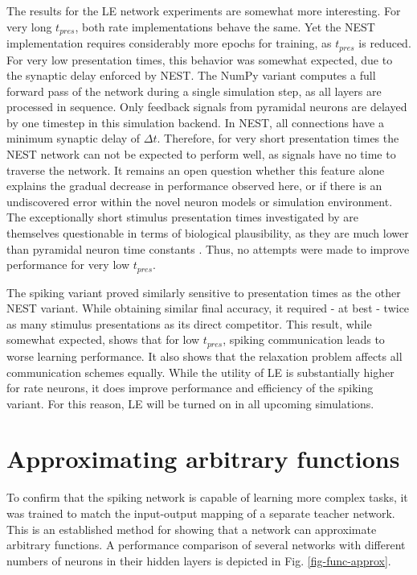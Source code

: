 The results for the LE network experiments are somewhat more interesting. For very long $t_{pres}$, both rate
implementations behave the same. Yet the NEST implementation requires considerably more epochs for training, as
$t_{pres}$ is reduced. For very low presentation times, this behavior was somewhat expected, due to the synaptic delay
enforced by NEST. The NumPy variant computes a full forward pass of the network during a single simulation step, as all
layers are processed in sequence. Only feedback signals from pyramidal neurons are delayed by one timestep in this
simulation backend. In NEST, all connections have a minimum synaptic delay of $\Delta t$. Therefore, for very short
presentation times the NEST network can not be expected to perform well, as signals have no time to traverse the
network. It remains an open question whether this feature alone explains the gradual decrease in performance observed
here, or if there is an undiscovered error within the novel neuron models or simulation environment. The exceptionally
short stimulus presentation times investigated by \citep{Haider2021} are themselves questionable in terms of biological
plausibility, as they are much lower than pyramidal neuron time constants \citep{McCormick1985}. Thus, no attempts were
made to improve performance for very low $t_{pres}$.

The spiking variant proved similarly sensitive to presentation times as the other NEST variant. While obtaining similar
final accuracy, it required - at best - twice as many stimulus presentations as its direct competitor. This result,
while somewhat expected, shows that for low $t_{pres}$, spiking communication leads to worse learning performance. It
also shows that the relaxation problem affects all communication schemes equally. While the utility of LE is
substantially higher for rate neurons, it does improve performance and efficiency of the spiking variant. For this
reason, LE will be turned on in all upcoming simulations.

\section{Approximating arbitrary functions}\label{sec-func-approx}

To confirm that the spiking network is capable of learning more complex tasks, it was trained to match the input-output
mapping of a separate teacher network. This is an established method for showing that a network can approximate
arbitrary functions. A performance comparison of several networks with different numbers of neurons in their hidden
layers is depicted in Fig. \ref{fig-func-approx}.


